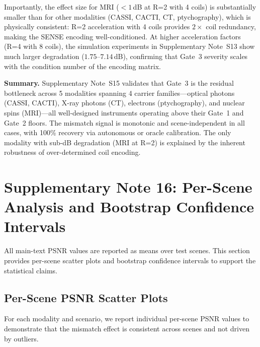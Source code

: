 \documentclass[11pt]{article}
\theoremstyle{definition}
\begin{document}
Importantly, the effect size for MRI ($< 1$\,dB at R=2 with 4 coils) is substantially smaller than for other modalities (CASSI, CACTI, CT, ptychography), which is physically consistent: R=2 acceleration with 4 coils provides $2\times$ coil redundancy, making the SENSE encoding well-conditioned.
At higher acceleration factors (R=4 with 8 coils), the simulation experiments in Supplementary Note~S13 show much larger degradation ($1.75$--$7.14$\,dB), confirming that Gate~3 severity scales with the condition number of the encoding matrix.

\vspace{1em}
\noindent\textbf{Summary.} Supplementary Note~S15 validates that Gate~3 is the residual bottleneck across 5 modalities spanning 4 carrier families---optical photons (CASSI, CACTI), X-ray photons (CT), electrons (ptychography), and nuclear spins (MRI)---all well-designed instruments operating above their Gate~1 and Gate~2 floors. The mismatch signal is monotonic and scene-independent in all cases, with 100\% recovery via autonomous or oracle calibration. The only modality with sub-dB degradation (MRI at R=2) is explained by the inherent robustness of over-determined coil encoding.


\section{Supplementary Note 16: Per-Scene Analysis and Bootstrap Confidence Intervals}
\label{sec:perscene}

All main-text PSNR values are reported as means over test scenes. This section provides per-scene scatter plots and bootstrap confidence intervals to support the statistical claims.

\subsection{Per-Scene PSNR Scatter Plots}

For each modality and scenario, we report individual per-scene PSNR values to demonstrate that the mismatch effect is consistent across scenes and not driven by outliers.
\end{document}

